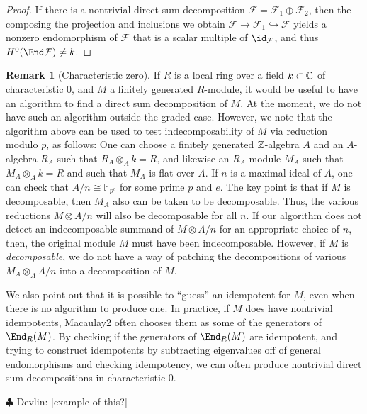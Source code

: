 \documentclass[12pt]{article}
\def\cF{\mathcal F}
\let\inc\hookrightarrow
\theoremstyle{theorem}
\numberwithin{thm}{section}
\theoremstyle{definition}
\newtheorem{rem}[thm]{Remark}
\newcommand{\devlin}[1]{{\color{red} \sf $\clubsuit$ Devlin: [#1]}}
\begin{document}
\begin{proof}
If there is a nontrivial direct sum decomposition $\cF = \cF_1\oplus \cF_2$, then the composing the projection and inclusions we obtain $\cF\to \cF_1\inc \cF$ yields a nonzero endomorphism of $\cF$ that is a scalar multiple of $\id_\cF$, and thus $H^0(\End \cF) \neq k$.
\end{proof}

\begin{rem}[Characteristic zero]
If $R$ is a local ring over a field $k\subset \mathbb C$ of characteristic 0, and $M$ a finitely generated $R$-module, it would be useful to have an algorithm to find a direct sum decomposition of $M$.
At the moment, we do not have such an algorithm outside the graded case.
However, we note that the algorithm above can be used to test indecomposability of $M$ via reduction modulo $p$, as follows:
One can choose a finitely generated $\mathbb Z$-algebra $A$ and an $A$-algebra $R_A$ such that $R_A\otimes _A k=R$, and likewise an $R_A$-module $M_A$ such that $M_A\otimes _A k = R$ and such that $M_A$ is flat over $A$. If $n$ is a maximal ideal of $A$, one can check that $A/n \cong \mathbb F_{p^e}$ for some prime $p$ and $e$.
The key point is that if $M$ is decomposable, then $M_A$ also can be taken to be decomposable. Thus, the various reductions  $M\otimes A/n$ will also be decomposable for all $n$.
If our algorithm does not detect an indecomposable summand of $M\otimes A/n$ for an appropriate choice of $n$, then, the original module $M$ must have been indecomposable.
However, if $M$ is \emph{decomposable}, we do not have a way of patching the decompositions of various $M_A\otimes_A A/n$ into a decomposition of $M$.

We also point out that it is possible to ``guess'' an idempotent for $M$, even when there is no algorithm to produce one. In practice, if $M$ does have nontrivial idempotents, Macaulay2 often chooses them as some of the generators of $\End_R(M)$. By checking if the generators of $\End_R(M)$ are idempotent, and trying to construct idempotents by subtracting eigenvalues off of general endomorphisms and checking idempotency, we can often produce nontrivial direct sum decompositions in characteristic 0.

\devlin{example of this?}
\end{rem}
\end{document}
